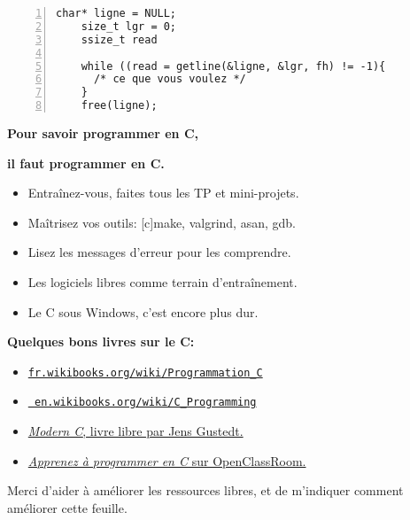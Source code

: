 \documentclass[a4paper,10pt,landscape]{article}
\newcommand{\Subsection}[1]{{\textbf{#1}}}
\begin{document}
\begin{multicols}{3}

  \smallskip
  \begin{Verbatim}[label=Lecture d'un fichier ligne à ligne, gobble=4, frame=single,
    numbers=left,numbersep=2pt]
    char* ligne = NULL;
    size_t lgr = 0;
    ssize_t read

    while ((read = getline(&ligne, &lgr, fh) != -1){
      /* ce que vous voulez */
    }
    free(ligne);
  \end{Verbatim}  

  \centerline{\bf\large Pour savoir programmer en C,}
  \centerline{\bf\large il faut programmer en C.}
  \begin{itemize}[noitemsep]
  \item Entraînez-vous, faites tous les TP et mini-projets.
  \item Maîtrisez vos outils: [c]make, valgrind, asan, gdb.
  \item Lisez les messages d'erreur pour les comprendre.
  \item Les logiciels libres comme terrain d'entraînement.
  \item Le C sous Windows, c'est encore plus dur.
  \end{itemize}

  \Subsection{Quelques bons livres sur le C:}
  \begin{itemize}[noitemsep,nolistsep]
  \item \href{https://fr.wikibooks.org/wiki/Programmation_C}{\tt fr.wikibooks.org/wiki/Programmation\_C}
  \item \href{https://en.wikibooks.org/wiki/C_Programming}{\tt
      en.wikibooks.org/wiki/C\_Programming}
     
  \item
    \href{http://icube-icps.unistra.fr/index.php/File:ModernC.pdf}
      {{\it Modern C}, livre libre par Jens Gustedt.}
  \item
    \href{https://openclassrooms.com/courses/apprenez-a-programmer-en-c}
    {{\it Apprenez à programmer en C} sur OpenClassRoom.}
  \end{itemize}

  \bigskip %
  Merci d'aider à améliorer les ressources libres, et de m'indiquer
  comment améliorer cette feuille.  %
  \vfill

  ~
  \columnbreak %


\end{multicols}
\end{document}
